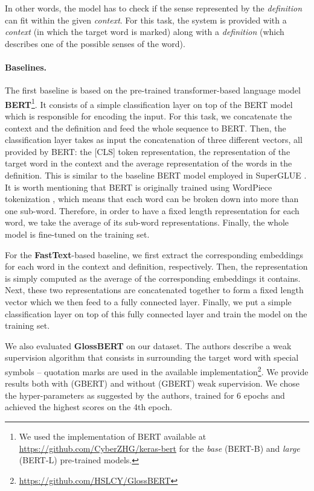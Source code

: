 \documentclass[11pt,a4paper]{article}
\begin{document}
In other words, the model has to check if the sense represented by the {\it definition} can fit within the given {\it context}.
For this task, the system is provided with a {\it context} (in which the target word is marked) along with a {\it definition} (which describes one of the possible senses of the word).

\paragraph{Baselines.}
The first baseline is based on the pre-trained transformer-based language model \textbf{BERT}\footnote{We used the implementation of BERT available at \url{https://github.com/CyberZHG/keras-bert} for the {\it base} (BERT-B) and {\it large} (BERT-L) pre-trained models.}. It consists of a simple classification layer on top of the BERT model which is responsible for encoding the input.
For this task, we concatenate the context and the definition and feed the whole sequence to BERT. Then, the classification layer takes as input the concatenation of three different vectors, all provided by BERT: the \textsc{[CLS]} token representation, the representation of the target word in the context and the average representation of the words in the definition. This is similar to the baseline BERT model employed in SuperGLUE \cite{wang2019superglue}. It is worth mentioning that BERT is originally trained using WordPiece tokenization \cite{wu2016google}, which means that each word can be broken down into more than one sub-word. Therefore, in order to have a fixed length representation for each word, we take the average of its sub-word representations. Finally, the whole model is fine-tuned on the training set.

For the \textbf{FastText}-based baseline, we first extract the corresponding embeddings for each word in the context and definition, respectively. Then, the representation is simply computed as the average of the corresponding embeddings it contains. Next, these two representations are concatenated together to form a fixed length vector which we then feed to a fully connected layer. Finally, we put a simple classification layer on top of this fully connected layer and train the model on the training set.

We also evaluated \textbf{GlossBERT} \cite{huang-etal-2019-glossbert} on our dataset.
The authors describe a weak supervision algorithm that consists in surrounding the target word with special symbols -- quotation marks are used in the available implementation\footnote{\url{https://github.com/HSLCY/GlossBERT}}. We provide results both with (GBERT) and without (GBERT) weak supervision. We chose the hyper-parameters as suggested by the authors, trained for 6 epochs and achieved the highest scores on the 4th epoch.
\end{document}
